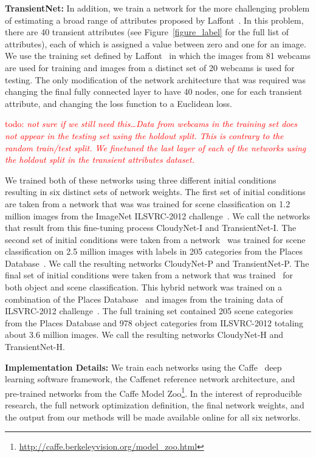\documentclass{article}
\newcommand{\todo}[1]{\textcolor{red}{todo: {\em #1}}}
\begin{document}
\textbf{TransientNet:} In addition, we train a network for the more
challenging problem of estimating a broad range of attributes proposed
by Laffont~\cite{Laffont14}.  In this problem, there are 40 transient
attributes (see Figure~\ref{figure_label} for the full list of
attributes), each of which is assigned a value between zero and one
for an image. We use the training set defined by
Laffont~\cite{Laffont14} in which the images from 81 webcams are used
for training and images from a distinct set of 20 webcams is used for
testing.  The only modification of the network architecture that was
required was changing the final fully connected layer to have 40
nodes, one for each transient attribute, and changing the loss
function to a Euclidean loss. 

\todo{not sure if we still need this\dots Data from webcams in the
training set does not appear in the testing set using the holdout
split.  This is contrary to the random train/test split.  We finetuned
the last layer of each of the networks using the holdout split in the
transient attributes dataset.}

We trained both of these networks using three different initial
conditions resulting in six distinct sets of network weights. The
first set of initial conditions are taken from a network that was was
trained for scene classification on 1.2 million images from the
ImageNet ILSVRC-2012 challenge~\cite{ILSVRCarxiv14}.  We call the
networks that result from this fine-tuning process CloudyNet-I and
TransientNet-I.  The second set of initial conditions were taken from
a network~\cite{zhou2014places} was trained for scene classification
on 2.5 million images with labels in 205 categories from the Places
Database~\cite{zhou2014places}. We call the resulting networks
CloudyNet-P and TransientNet-P.  The final set of initial conditions
were taken from a network that was trained~\cite{zhou2014places} for
both object and scene classification.  This hybrid network was trained
on a combination of the Places Database~\cite{zhou2014places} and
images from the training data of ILSVRC-2012
challenge~\cite{ILSVRCarxiv14}.  The full training set contained 205
scene categories from the Places Database and 978 object categories
from ILSVRC-2012 totaling about 3.6 million images.  We call the
resulting networks CloudyNet-H and TransientNet-H.

\textbf{Implementation Details:} We train each networks using the
Caffe~\cite{caffe14} deep learning software framework, the Caffenet
reference network architecture, and pre-trained networks from the
Caffe Model
Zoo\footnote{\url{http://caffe.berkeleyvision.org/model_zoo.html}}.
In the interest of reproducible research, the full network
optimization definition, the final network weights, and the output
from our methods will be made available online for all six networks.
\end{document}
